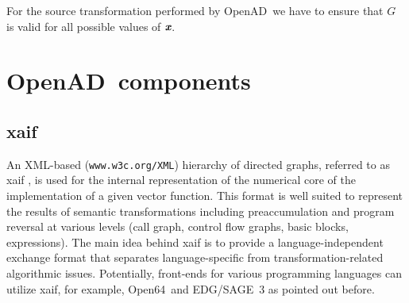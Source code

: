 \documentclass[acmtocl,acmnow]{acmtrans2m}
\newcommand{\OpenAD}{OpenAD}
\newcommand{\OpenSixtyFour}{Open64}
\newcommand{\bmx}{\mbox{\bf\em x}}
\begin{document}
For the source transformation performed by \OpenAD\ we have to ensure that 
$G$ is valid for all possible values of $\bmx$. 




 








\section{\OpenAD\ components}
\subsection{xaif} 
An XML-based ({\tt www.w3c.org/XML}) hierarchy of directed graphs, referred to as xaif 
\cite{HNN02}, is used for the 
internal representation of the numerical core of the implementation
of a given vector function. This format is 
well suited to represent the results of  semantic transformations including 
preaccumulation \cite{BiHa96,CDB96,GrRe91} and 
program reversal \cite{Gri92,WaGr01} at various levels (call graph, control 
flow graphs, basic blocks, expressions). 
The main idea behind xaif is to provide a language-independent exchange
format that separates language-specific from transformation-related 
algorithmic issues. Potentially, front-ends for various programming languages 
can utilize xaif, for example, \OpenSixtyFour\ and EDG/SAGE~3 as pointed out before.

\end{document}

